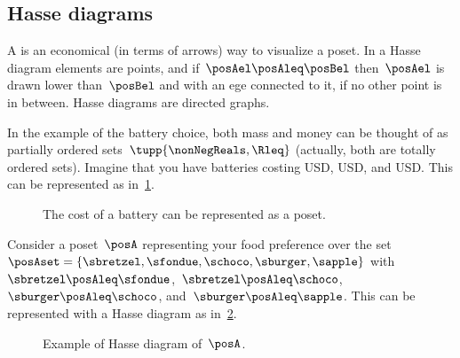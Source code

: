 \subsection{Hasse diagrams}

A \emph{} is an economical (in terms of arrows) way to visualize a poset.
In a Hasse diagram elements are points, and if~$\posAel \posAleq \posBel$ then~$\posAel$ is drawn lower than~$\posBel$ and with an ege connected to it, if no other point is in between.
Hasse diagrams are directed graphs.


In the example of the battery choice, both mass and money can be thought of as partially ordered sets~$\tupp{\nonNegReals,\Rleq}$ (actually, both are totally ordered sets).
Imagine that you have batteries costing \unit[10]{USD}, \unit[20]{USD}, and \unit[30]{USD}.
This can be represented as in~\cref{fig:hassebattery}.

\begin{figure}[h!]
    \centering
    \caption{The cost of a battery can be represented as a poset.}
    \label{fig:hassebattery}
\end{figure}


\begin{example}
    Consider a poset~$\posA$ representing your food preference over the set~$\posAset=\{\sbretzel,\sfondue,\schoco,\sburger,\sapple\}$ with~$\sbretzel\posAleq \sfondue$,~$\sbretzel\posAleq \schoco$,~$\sburger\posAleq \schoco$, and~$\sburger\posAleq \sapple$.
    This can be represented with a Hasse diagram as in~\cref{fig:hasse}.
\end{example}

\begin{figure}[h!]
    \centering
    \caption{Example of Hasse diagram of~$\posA$.}
    \label{fig:hasse}
\end{figure}

\begin{marginfigure}
    \centering
    \caption{}
    \label{fig:boolean}
\end{marginfigure}

